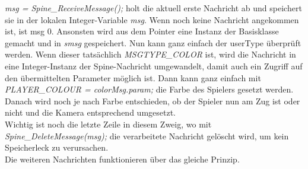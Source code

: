 \documentclass{article}
\begin{document}
\textit{msg = Spine\_ReceiveMessage();} holt die aktuell erste Nachricht ab und speichert sie in der lokalen Integer-Variable \textit{msg}. Wenn noch keine Nachricht angekommen ist, ist msg 0. Ansonsten wird aus dem Pointer eine Instanz der Basisklasse gemacht und in \textit{smsg} gespeichert. Nun kann ganz einfach der userType überprüft werden. Wenn dieser tatsächlich \textit{MSGTYPE\_COLOR} ist, wird die Nachricht in eine Integer-Instanz der Spine-Nachricht umgewandelt, damit auch ein Zugriff auf den übermittelten Parameter möglich ist. Dann kann ganz einfach mit \textit{PLAYER\_COLOUR = colorMsg.param;} die Farbe des Spielers gesetzt werden. Danach wird noch je nach Farbe entschieden, ob der Spieler nun am Zug ist oder nicht und die Kamera entsprechend umgesetzt.\\

Wichtig ist noch die letzte Zeile in diesem Zweig, wo mit \textit{Spine\_DeleteMessage(msg);} die verarbeitete Nachricht gelöscht wird, um kein Speicherleck zu verursachen.\\

Die weiteren Nachrichten funktionieren über das gleiche Prinzip.
\end{document}
